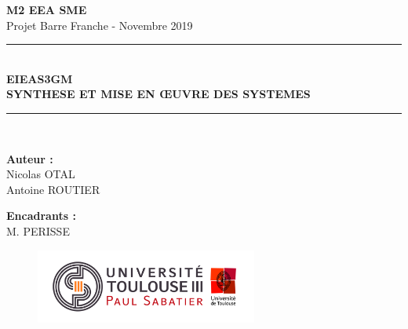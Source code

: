 \begin{titlepage}
    \begin{center}
    \huge{\textbf{M2 EEA SME}}\\[0.5 cm]
    {\large Projet Barre Franche - Novembre 2019}\\[0.5cm]
    
    \rule{\linewidth}{0.5mm} \\[0.4cm]
    {\huge \bfseries EIEAS3GM \\ SYNTHESE ET MISE EN ŒUVRE DES SYSTEMES\\[0.4cm]}
    \rule{\linewidth}{0.5mm} \\[1.5cm]
    
    
    
    \begin{center}
    \begin{minipage}[t]{0.46\textwidth}
      \begin{flushleft} \large
        \textbf{Auteur :}\\
        Nicolas OTAL\\
        Antoine ROUTIER\\
      \end{flushleft}
    \end{minipage}
    \begin{minipage}[t]{0.46\textwidth}
      \begin{flushright} \large
        \textbf{Encadrants :}\\
        M. PERISSE\\
      \end{flushright}
    \end{minipage}
    \end{center}
    
    \vfill
    
    
    \begin{figure}[b]
    \centering
    \includegraphics[width=0.65\textwidth]{images/Upstls.jpg}
    \end{figure}
    
    \end{center}
    \end{titlepage}